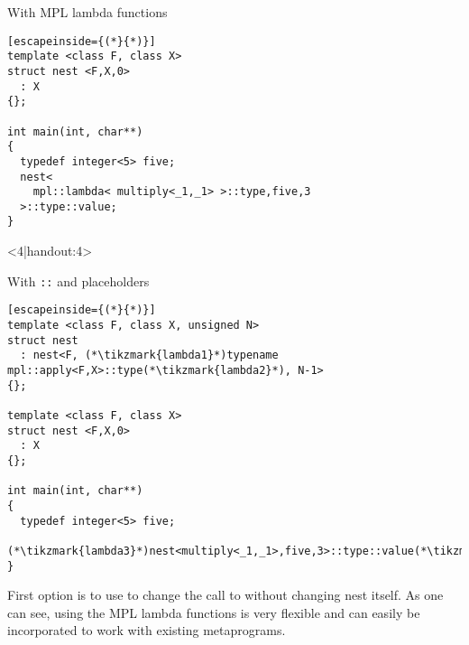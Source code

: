\documentclass[11pt,a4paper,dvipsnames,usenames]{beamer}
\begin{document}
\begin{frame}[fragile]
\begin{onlyenv}
\begin{exampleblock}{With MPL lambda functions}
\begin{lstlisting}[escapeinside={(*}{*)}]
template <class F, class X>
struct nest <F,X,0>
  : X
{};

int main(int, char**)
{
  typedef integer<5> five;
  nest<
    mpl::lambda< multiply<_1,_1> >::type,five,3
  >::type::value;
}
  \end{lstlisting}
  \end{exampleblock}


  \end{onlyenv}

  \begin{onlyenv}<4|handout:4>
    \begin{exampleblock}{With {\texttt{::}} {\color{OliveGreen} and placeholders}}
  \begin{lstlisting}[escapeinside={(*}{*)}]
template <class F, class X, unsigned N>
struct nest
  : nest<F, (*\tikzmark{lambda1}*)typename mpl::apply<F,X>::type(*\tikzmark{lambda2}*), N-1>
{};

template <class F, class X>
struct nest <F,X,0>
  : X
{};

int main(int, char**)
{
  typedef integer<5> five;
  (*\tikzmark{lambda3}*)nest<multiply<_1,_1>,five,3>::type::value(*\tikzmark{lambda4}*);
}
  \end{lstlisting}
  \end{exampleblock}


  \end{onlyenv}

  {
    First option is to use  to change the call to  without changing nest itself.
    As one can see, using the MPL lambda functions is very flexible and can easily be incorporated to work with
    existing metaprograms.

}
\end{frame}
\end{document}
